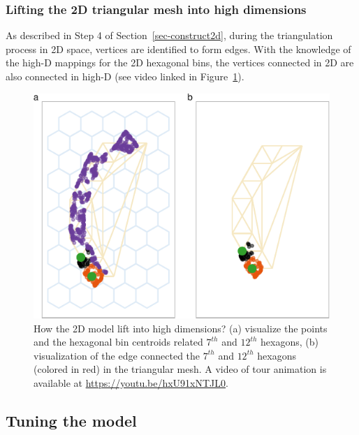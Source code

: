 \documentclass[
  12pt]{article}
\begin{document}
\hypertarget{lifting-the-2d-triangular-mesh-into-high-dimensions}{%
\subsubsection{Lifting the 2D triangular mesh into high
dimensions}\label{lifting-the-2d-triangular-mesh-into-high-dimensions}}

As described in Step 4 of Section~\ref{sec-construct2d}, during the
triangulation process in 2D space, vertices are identified to form
edges. With the knowledge of the high-D mappings for the 2D hexagonal
bins, the vertices connected in 2D are also connected in high-D (see
video linked in Figure~\ref{fig-wkhighD}).

\begin{figure}

{\centering \includegraphics{paper_files/figure-pdf/fig-wkhighD-1.pdf}

}

\caption{\label{fig-wkhighD}How the 2D model lift into high dimensions?
(a) visualize the points and the hexagonal bin centroids related
\(7^{th}\) and \(12^{th}\) hexagons, (b) visualization of the edge
connected the \(7^{th}\) and \(12^{th}\) hexagons (colored in red) in
the triangular mesh. A video of tour animation is available at
\url{https://youtu.be/hxU91xNTJL0}.}

\end{figure}

\hypertarget{tuning-the-model}{%
\subsection{Tuning the model}\label{tuning-the-model}}
\end{document}

